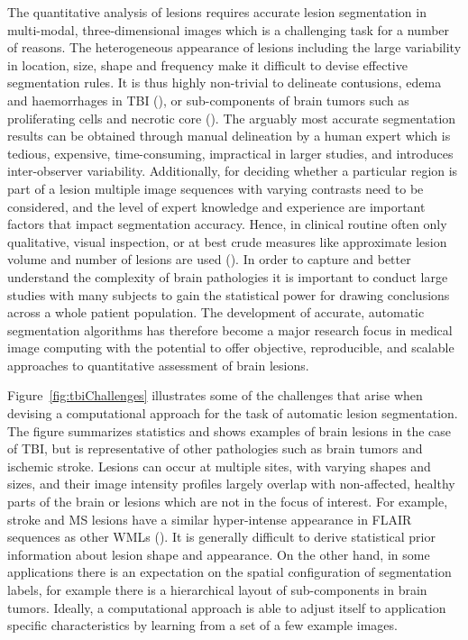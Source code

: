 The quantitative analysis of lesions requires accurate lesion segmentation in multi-modal, three-dimensional images which is a challenging task for a number of reasons. The heterogeneous appearance of lesions including the large variability in location, size, shape and frequency make it difficult to devise effective segmentation rules.
It is thus highly non-trivial to delineate contusions, edema and haemorrhages in TBI (\cite{Irimia2012a}), or sub-components of brain tumors such as proliferating cells and necrotic core (\cite{Menze2014}). The arguably most accurate segmentation results can be obtained through manual delineation by a human expert which is tedious, expensive, time-consuming, impractical in larger studies, and introduces inter-observer variability. Additionally, for deciding whether a particular region is part of a lesion multiple image sequences with varying contrasts need to be considered, and the level of expert knowledge and experience are important factors that impact segmentation accuracy. Hence, in clinical routine often only qualitative, visual inspection, or at best crude measures like approximate lesion volume and number of lesions are used (\cite{Yuh2012,Wen2010}). In order to capture and better understand the complexity of brain pathologies it is important to conduct large studies with many subjects to gain the statistical power for drawing conclusions across a whole patient population. The development of accurate, automatic segmentation algorithms has therefore become a major research focus in medical image computing with the potential to offer objective, reproducible, and scalable approaches to quantitative assessment of brain lesions.

Figure~\ref{fig:tbiChallenges} illustrates some of the challenges that arise when devising a computational approach for the task of automatic lesion segmentation. The figure summarizes statistics and shows examples of brain lesions in the case of TBI, but is representative of other pathologies such as brain tumors and ischemic stroke. Lesions can occur at multiple sites, with varying shapes and sizes, and their image intensity profiles largely overlap with non-affected, healthy parts of the brain or lesions which are not in the focus of interest. For example, stroke and MS lesions have a similar hyper-intense appearance in FLAIR sequences as other WMLs (\cite{Mitra2014, Schmidt2012}). It is generally difficult to derive statistical prior information about lesion shape and appearance. On the other hand, in some applications there is an expectation on the spatial configuration of segmentation labels, for example there is a hierarchical layout of sub-components in brain tumors. Ideally, a computational approach is able to adjust itself to application specific characteristics by learning from a set of a few example images.

